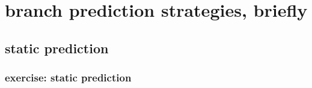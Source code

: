 \section{branch prediction strategies, briefly}

\subsection{static prediction}


\subsubsection{exercise: static prediction}

